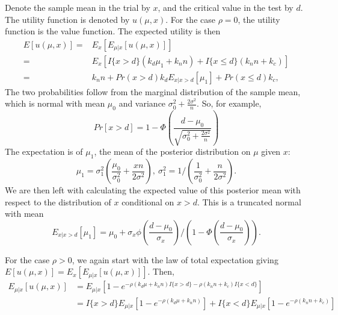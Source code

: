 \documentclass[sagev]{sagej}
\begin{document}
Denote the sample mean in the trial by $x$, and the critical value in the test by $d$. The utility function is denoted by $u(\mu, x)$. For the case $\rho = 0$, the utility function is the value function. The expected utility is then
\begin{align*}
E[u(\mu, x)] =& E_x\left[ E_{\mu | x} [u(\mu, x)] \right] \\
=& E_x \left[ I\{x > d\} (k_d \mu_1 + k_n n) + I\{x \leq d\} (k_n n + k_c) \right] \\
=& k_n n + Pr(x > d) k_d E_{x | x > d} \left[ \mu_1 \right] + Pr(x \leq d)k_c,
\end{align*}
The two probabilities follow from the marginal distribution of the sample mean, which is normal with mean $\mu_0$ and variance $\sigma_0^2 + \frac{2\sigma^2}{n}$. So, for example,
$$
Pr[x > d] = 1- \Phi\left(\frac{d-\mu_0}{\sqrt{\sigma_0^2 + \frac{2\sigma^2}{n}}} \right)
$$
The expectation is of $\mu_1$, the mean of the posterior distribution on $\mu$ given $x$:
$$
\mu_1 = \sigma_1^2 \left( \frac{\mu_0}{\sigma_0^2} + \frac{xn}{2\sigma^2} \right), ~ \sigma_1^2 = 1/\left( \frac{1}{\sigma_0^2} + \frac{n}{2\sigma^2} \right).
$$
We are then left with calculating the expected value of this posterior mean with respect to the distribution of $x$ conditional on $x > d$. This is a truncated normal with mean
$$
E_{x | x > d} \left[ \mu_1 \right] = \mu_0 + \sigma_x \phi\left(\frac{d - \mu_0}{\sigma_x} \right)/\left(1 - \Phi\left(\frac{d - \mu_0}{\sigma_x}\right) \right).
$$

For the case $\rho > 0$, we again start with the law of total expectation giving $E[u(\mu, x)] = E_x\left[ E_{\mu | x} [u(\mu, x)] \right]$. Then,
\begin{align*}
E_{\mu | x} [u(\mu, x)] &= E_{\mu | x}[1 - e^{-\rho(k_d\mu + k_n n) I\{x > d\} -\rho(k_n n + k_c) I\{x < d\}}] \\
&= I\{x > d\} E_{\mu | x}[1 - e^{-\rho(k_d\mu + k_n n)}] + I\{x < d\}E_{\mu | x}[1 - e^{-\rho(k_n n + k_c)}]
\end{align*}
\end{document}

